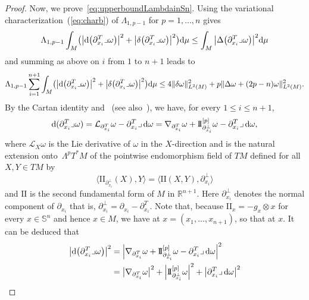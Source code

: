 \documentclass[10pt,a4paper]{amsart}
\newcommand{\R}{{\mathbb R}}
\numberwithin{equation}{section}
\theoremstyle{definition}
\begin{document}
\begin{proof}
Now, we prove~\eqref{eq:upperboundLambdainSn}. Using the variational characterization~(\ref{eq:charb}) of $\Lambda_{1,p-1}$ for $p=1,\dots,n$ gives
\[
\Lambda_{1,p-1}\int_{M}\bigl(\bigl|{\rm d}\bigl(\partial_{x_i}^T\lrcorner\omega\bigr)\bigr|^2+\bigl|\delta\bigl(\partial_{x_i}^T\lrcorner\omega\bigr)\bigr|^2\bigr){\rm d}\mu\leq \int_M\big|\Delta\bigl(\partial_{x_i}^T\lrcorner\omega\bigr)\big|^2{\rm d}\mu
\]
and summing as above on $i$ from $1$ to $n+1$ leads to
\[
\Lambda_{1,p-1}\sum_{i=1}^{n+1}\int_{M}\bigl(\bigl|{\rm d}\bigl(\partial_{x_i}^T\lrcorner\omega\bigr)\bigr|^2+\bigl|\delta\bigl(\partial_{x_i}^T\lrcorner\omega\bigr)\bigr|^2\bigr){\rm d}\mu\leq 4\|\delta\omega\|^2_{L^2(M)}+p\|\Delta\omega+(2p-n)\omega\|^2_{L^2(M)}.
\]
By the Cartan identity and~\cite[formula~(4.3)]{GueriniSavo2004} (see also~\cite[formula~(20)]{EGHM}), we have, for every $1\leq i\leq n+1$,
\begin{align*}
{\rm d}(\partial_{x_i}^T\lrcorner\omega)=\mathcal{L}_{\partial_{x_i}^T}\omega-\partial_{x_i}^T\lrcorner\,{\rm d}\omega
=\nabla_{\partial_{x_i}^T}\omega+\mathrm{I\!I}_{\partial^\perp_{x_i}}^{[p]}\omega-\partial_{x_i}^T\lrcorner\,{\rm d}\omega,
\end{align*}
where $\mathcal{L}_X\omega$ is the Lie derivative of $\omega$ in the $X$-direction and  is the natural extension onto~$\Lambda^p T^*M$ of the pointwise endomorphism field  of $TM$ defined for all $X,Y\in TM$ by
\[
\bigl\langle \mathrm{I\!I}_{\partial^\perp_{x_i}}(X),Y\bigr\rangle = \bigl\langle\mathrm{I\!I}(X,Y),\partial^\perp_{x_i}\bigr\rangle
\] and $\mathrm{I\!I}$ is the second fundamental form of $M$ in $\R^{n+1}$.
Here $\partial^\perp_{x_i}$ denotes the normal component of $\partial_{x_i}$ that is, $\partial^\perp_{x_i}=\partial_{x_i}-\partial^T_{x_i}$.
Note that, because $\mathrm{I\!I}_x=-g_x\otimes x$ for every $x\in\mathbb{S}^n$ and hence $x\in M$, we have  at $x=(x_1,\dots,x_{n+1})$, so that  at $x$.
It can be deduced that
\begin{align*}
\bigl|{\rm d} \bigl(\partial_{x_i}^T\lrcorner\omega\bigr)\bigr|^2 ={}&\Bigl|\nabla_{\partial_{x_i}^T}\omega+\mathrm{I\!I}_{\partial^\perp_{x_i}}^{[p]}\omega-\partial_{x_i}^T\lrcorner\,{\rm d}\omega\Bigr|^2\\
={}&\bigl|\nabla_{\partial_{x_i}^T}\omega\bigr|^2+\Bigl|\mathrm{I\!I}_{\partial^\perp_{x_i}}^{[p]}\omega\Bigr|^2+\bigl|\partial_{x_i}^T\lrcorner\,{\rm d}\omega\bigr|^2\\

\end{align*}
\end{proof}
\end{document}
